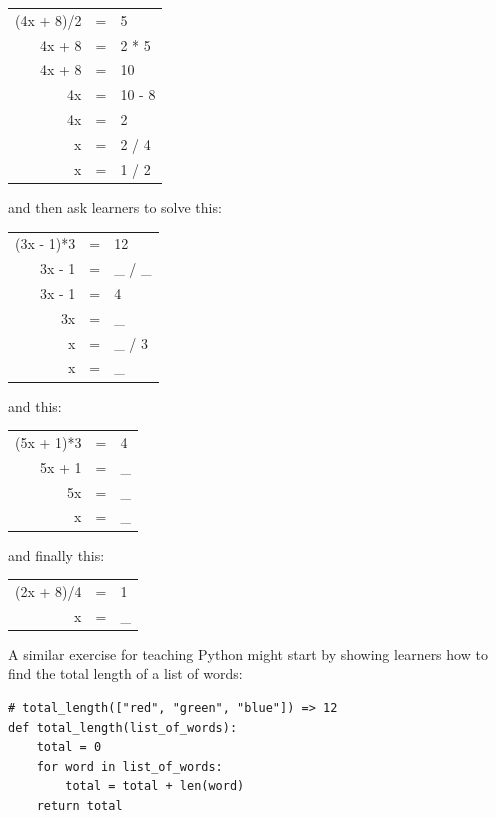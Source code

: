 \begin{center}
\begin{tabular}{rcl}
  (4x + 8)/2	& = &	5	\\
  4x + 8	& = &	2 * 5	\\
  4x + 8	& = &	10	\\
  4x		& = &	10 - 8	\\
  4x		& = &	2	\\
  x		& = &	2 / 4	\\
  x		& = &	1 / 2
\end{tabular}
\end{center}

\noindent
and then ask learners to solve this:

\begin{center}
\begin{tabular}{rcl}
  (3x - 1)*3	& = &	12	\\
  3x - 1	& = &	\_ / \_	\\
  3x - 1	& = &	4	\\
  3x		& = &	\_	\\
  x		& = &	\_ / 3	\\
  x		& = &	\_
\end{tabular}
\end{center}

\noindent
and this:

\begin{center}
\begin{tabular}{rcl}
  (5x + 1)*3	& = &	4	\\
  5x + 1	& = &	\_ 	\\
  5x		& = &	\_ 	\\
  x		& = &	\_
\end{tabular}
\end{center}

\noindent
and finally this:

\begin{center}
\begin{tabular}{rcl}
  (2x + 8)/4	& = &	1	\\
   x		& = &	\_
\end{tabular}
\end{center}

A similar exercise for teaching Python might start by showing learners
how to find the total length of a list of words:

\begin{verbatim}
# total_length(["red", "green", "blue"]) => 12
def total_length(list_of_words):
    total = 0
    for word in list_of_words:
        total = total + len(word)
    return total
\end{verbatim}

